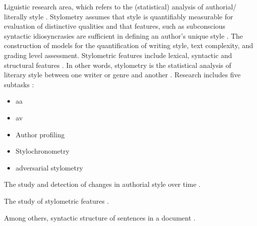 \begin{definition}
    [Stylometry]
    Liguistic research area, which refers to the (statistical) analysis of authorial/ literally style \cite{elmanarelbouanani_authorship_2014,neal_surveying_2018}.
    Stylometry assumes that style is quantifiably measurable for evaluation of distinctive qualities and 
    that features, such as subconscious syntactic idiosyncrasies are sufficient in defining an author's unique style \cite{neal_surveying_2018}.
    The construction of models for the quantification of writing style, text complexity, and grading level assessment.
    Stylometric features include lexical, syntactic and structural features \cite{stein_intrinsic_2011}.
    In other words, stylometry is the statistical analysis of literary style between one writer or genre and another \cite{tyo_state_2022}.
    Research includes five subtasks \cite{neal_surveying_2018}:
    \begin{itemize}
        \item \ac{aa}
        \item \ac{av}
        \item Author profiling
        \item Stylochronometry
        \item adversarial stylometry
    \end{itemize}
\end{definition}

\begin{definition}
    [Stylochronometry]
    The study and detection of changes in authorial style over time \cite{neal_surveying_2018}.
\end{definition}

\begin{definition}
    [Stylistics]
    The study of stylometric features \cite{elmanarelbouanani_authorship_2014,abbasi_writeprints_2008}.
\end{definition}

\begin{definition}
    Among others, syntactic structure of sentences in a document \cite{jafariakinabad_self_supervised_2022}.
\end{definition}

